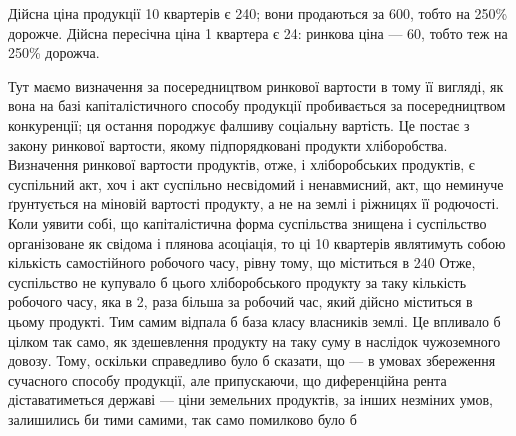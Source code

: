 Дійсна ціна продукції 10 квартерів є 240; вони продаються за 600, тобто на 250\% дорожче.
Дійсна пересічна ціна 1 квартера є 24: ринкова ціна — 60, тобто теж на 250\% дорожча.

Тут маємо визначення за посередництвом ринкової вартости в тому її вигляді, як вона на базі
капіталістичного способу продукції пробивається за посередництвом конкуренції; ця остання породжує
фалшиву соціальну вартість. Це постає з закону ринкової вартости, якому підпорядковані продукти
хліборобства.
Визначення ринкової вартости продуктів, отже, і хліборобських продуктів, є суспільний акт, хоч і акт
суспільно несвідомий і ненавмисний, акт, що неминуче ґрунтується на міновій вартості продукту, а не
на землі і ріжницях її родючості. Коли уявити собі, що капіталістична форма суспільства знищена і
суспільство організоване як свідома і плянова асоціація, то ці 10 квартерів являтимуть собою
кількість самостійного робочого часу, рівну тому, що міститься в 240 Отже, суспільство не
купувало б цього хліборобського продукту за таку кількість робочого часу, яка в 2, раза більша
за робочий час, який дійсно міститься в цьому продукті. Тим самим відпала б база класу власників
землі. Це впливало б цілком так само, як здешевлення продукту на таку суму в наслідок чужоземного
довозу. Тому, оскільки справедливо було б сказати, що — в умовах збереження сучасного способу
продукції, але припускаючи, що диференційна рента діставатиметься державі — ціни земельних
продуктів, за інших незміних умов, залишились би тими самими, так само помилково було б
\parbreak{}  %
